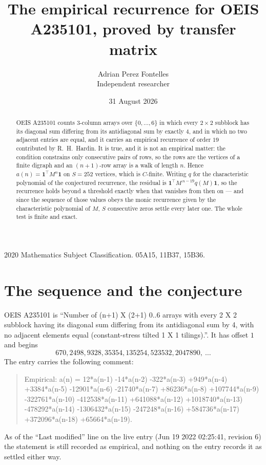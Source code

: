 \documentclass[11pt,a4paper]{article}
\title{The empirical recurrence for OEIS A235101, proved by transfer matrix}
\author{Adrian Perez Fontelles\\ \small Independent researcher}
\date{31 August 2026}
\theoremstyle{plain}
\theoremstyle{definition}
\begin{document}
\maketitle

\begin{abstract}
OEIS A235101 counts $3$-column arrays over $\{0,\dots,6\}$ in which every
$2\times2$ subblock has its diagonal sum differing from its antidiagonal sum by
exactly $4$, and in which no two adjacent entries are equal, and it
carries an empirical recurrence of order $19$ contributed by R.~H.~Hardin. It is true,
and it is not an empirical matter: the condition constrains only consecutive pairs of rows,
so the rows are the vertices of a finite digraph and an $(n+1)$-row array is a walk of
length $n$. Hence $a(n)=\mathbf{1}^{\!\top}M^{n}\mathbf{1}$ on $S=252$ vertices, which
is $C$-finite. Writing $q$ for the characteristic polynomial of the conjectured recurrence,
the residual is $\mathbf{1}^{\!\top}M^{\,n-19}q(M)\mathbf{1}$, so the recurrence
holds beyond a threshold exactly when that vanishes from then on --- and since the sequence
of those values obeys the monic recurrence given by the characteristic polynomial of $M$,
$S$ consecutive zeros settle every later one. The whole test is finite and exact.
\end{abstract}

\noindent\small 2020 Mathematics Subject Classification. 05A15, 11B37, 15B36.\normalsize

\section{The sequence and the conjecture}

OEIS A235101 is ``Number of (n+1) X (2+1) 0..6 arrays with every 2 X 2 subblock having its diagonal sum differing from its antidiagonal sum by 4, with no adjacent elements equal (constant-stress tilted 1 X 1 tilings).''. It has offset
$1$ and begins
\[
670, 2498, 9328, 35354, 135254, 523532, 2047890,\ \dots
\]
The entry carries the following comment:
\begin{quote}\small
Empirical: a(n) = 12*a(n-1) -14*a(n-2) -322*a(n-3) +949*a(n-4) +3384*a(n-5) -12901*a(n-6) -21740*a(n-7) +86236*a(n-8) +107744*a(n-9) -322761*a(n-10) -412538*a(n-11) +641088*a(n-12) +1018740*a(n-13) -478292*a(n-14) -1306432*a(n-15) -247248*a(n-16) +584736*a(n-17) +372096*a(n-18) +65664*a(n-19).
\end{quote}
As of the ``Last modified'' line on the live entry (Jun 19 2022 02:25:41, revision 6) the statement is
still recorded as empirical, and nothing on the entry records it as settled either way.
\end{document}
